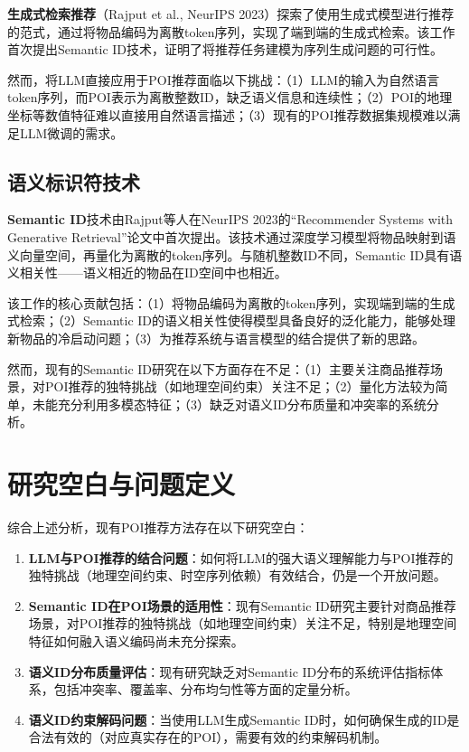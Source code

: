 \textbf{生成式检索推荐}\cite{rajput2023recommender}（Rajput et al., NeurIPS 2023）探索了使用生成式模型进行推荐的范式，通过将物品编码为离散token序列，实现了端到端的生成式检索。该工作首次提出Semantic ID技术，证明了将推荐任务建模为序列生成问题的可行性。

然而，将LLM直接应用于POI推荐面临以下挑战：（1）LLM的输入为自然语言token序列，而POI表示为离散整数ID，缺乏语义信息和连续性；（2）POI的地理坐标等数值特征难以直接用自然语言描述；（3）现有的POI推荐数据集规模难以满足LLM微调的需求。

\subsection{语义标识符技术}
\label{sec:semantic_id}

\textbf{Semantic ID}技术由Rajput等人在NeurIPS 2023的``Recommender Systems with Generative Retrieval''论文中首次提出。该技术通过深度学习模型将物品映射到语义向量空间，再量化为离散的token序列。与随机整数ID不同，Semantic ID具有语义相关性——语义相近的物品在ID空间中也相近。

该工作的核心贡献包括：（1）将物品编码为离散的token序列，实现端到端的生成式检索；（2）Semantic ID的语义相关性使得模型具备良好的泛化能力，能够处理新物品的冷启动问题；（3）为推荐系统与语言模型的结合提供了新的思路。

然而，现有的Semantic ID研究在以下方面存在不足：（1）主要关注商品推荐场景，对POI推荐的独特挑战（如地理空间约束）关注不足；（2）量化方法较为简单，未能充分利用多模态特征；（3）缺乏对语义ID分布质量和冲突率的系统分析。

\section{研究空白与问题定义}
\label{sec:gap}

综合上述分析，现有POI推荐方法存在以下研究空白：

\begin{enumerate}
    \item \textbf{LLM与POI推荐的结合问题}：如何将LLM的强大语义理解能力与POI推荐的独特挑战（地理空间约束、时空序列依赖）有效结合，仍是一个开放问题。
    \item \textbf{Semantic ID在POI场景的适用性}：现有Semantic ID研究主要针对商品推荐场景，对POI推荐的独特挑战（如地理空间约束）关注不足，特别是地理空间特征如何融入语义编码尚未充分探索。
    \item \textbf{语义ID分布质量评估}：现有研究缺乏对Semantic ID分布的系统评估指标体系，包括冲突率、覆盖率、分布均匀性等方面的定量分析。
    \item \textbf{语义ID约束解码问题}：当使用LLM生成Semantic ID时，如何确保生成的ID是合法有效的（对应真实存在的POI），需要有效的约束解码机制。
\end{enumerate}

